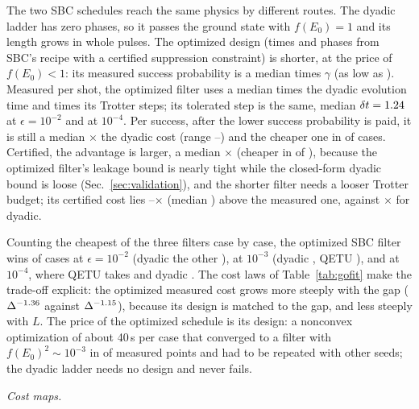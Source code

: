 \documentclass[aps,pra,twocolumn,superscriptaddress,nofootinbib]{revtex4-2}
\begin{document}
The two SBC schedules reach the same physics by different routes. The dyadic ladder has zero phases, so it
passes the ground state with $f(E_0)=1$ and its length grows in whole pulses. The optimized design
(times and phases from SBC's recipe with a certified suppression constraint) is shorter, at the price of
$f(E_0)<1$: its measured success probability is a median \optPgMed{} times $\gamma$ (as low as
\optPgLo). Measured per shot, the optimized filter uses a median \odShotTime{} times the dyadic evolution
time and \odShotSteps{} times its Trotter steps; its tolerated step is the same, median $\delta
t=1.24$ at $\epsilon=10^{-2}$ and \fDtOFour{} at $10^{-4}$. Per success, after the lower success
probability is paid, it is still a median \odMMed$\times$ the dyadic cost (range \odMLo--\odMHi) and the
cheaper one in \odMWins{} of \goNcases{} cases. Certified, the advantage is larger, a median \odCMed$\times$
(cheaper in \odCWins{} of \goNcases), because the optimized filter's leakage bound is nearly tight while the
closed-form dyadic bound is loose (Sec.~\ref{sec:validation}), and the shorter filter needs a looser Trotter
budget; its certified cost lies \goCertRatioOptMin--\goCertRatioOptMax$\times$ (median
\goCertRatioOptMed) above the measured one, against \goCertRatioMed$\times$ for dyadic.

Counting the cheapest of the three filters case by case, the optimized SBC filter wins \bestOpTwo{} of
\goCasesTwo{} cases at $\epsilon=10^{-2}$ (dyadic the other \bestDyTwo), \bestOpThree{} at $10^{-3}$
(dyadic \bestDyThree, QETU \bestQeThree), and \bestOpFour{} at $10^{-4}$, where QETU takes \bestQeFour{} and
dyadic \bestDyFour. The cost laws of Table~\ref{tab:gofit} make the trade-off explicit: the optimized
measured cost grows more steeply with the gap ($\Delta^{-1.36}$ against $\Delta^{-1.15}$), because its
design is matched to the gap, and less steeply with $L$. The price of the optimized schedule is its
design: a nonconvex optimization of about 40\,s per case that converged to a filter with $f(E_0)^2\sim10^{-3}$
in \optRetried{} of \optPoints{} measured points and had to be repeated with other seeds; the dyadic ladder
needs no design and never fails.

\emph{Cost maps.}
\end{document}
